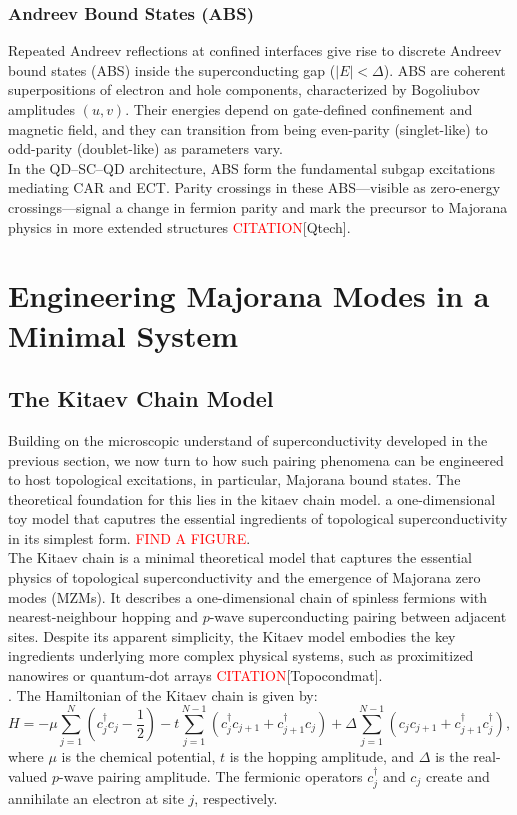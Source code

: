 \documentclass[11pt, letterpaper, titlepage]{article}
\begin{document}
\subsubsection{Andreev Bound States (ABS)}
Repeated Andreev reflections at confined interfaces give rise to discrete Andreev bound states (ABS) inside the superconducting gap ($|E|<\Delta$). ABS are coherent superpositions of electron and hole components, characterized by Bogoliubov amplitudes $(u,v)$. Their energies depend on gate-defined confinement and magnetic field, and they can transition from being even-parity (singlet-like) to odd-parity (doublet-like) as parameters vary.\\
In the QD–SC–QD architecture, ABS form the fundamental subgap excitations mediating CAR and ECT. Parity crossings in these ABS—visible as zero-energy crossings—signal a change in fermion parity and mark the precursor to Majorana physics in more extended structures \textcolor{red}{CITATION}[Qtech].


\section{Engineering Majorana Modes in a Minimal System}
\subsection{The Kitaev Chain Model}
Building on the microscopic understand of superconductivity developed in the previous section, we now turn to how such pairing phenomena can be engineered to host topological excitations, in particular, Majorana bound states. The theoretical foundation for this lies in the kitaev chain model. a one-dimensional toy model that caputres the essential ingredients of topological superconductivity in its simplest form. \textcolor{red}{FIND A FIGURE}.\\
The Kitaev chain is a minimal theoretical model that captures the essential physics of topological superconductivity and the emergence of Majorana zero modes (MZMs). It describes a one-dimensional chain of spinless fermions with nearest-neighbour hopping and $p$-wave superconducting pairing between adjacent sites. Despite its apparent simplicity, the Kitaev model embodies the key ingredients underlying more complex physical systems, such as proximitized nanowires or quantum-dot arrays \textcolor{red}{CITATION}[Topocondmat].\\.
The Hamiltonian of the Kitaev chain is given by:
\begin{equation}
H = -\mu \sum_{j=1}^{N} \left(c_j^\dagger c_j - \frac{1}{2}\right)
- t \sum_{j=1}^{N-1} \left(c_j^\dagger c_{j+1} + c_{j+1}^\dagger c_j\right)
+ \Delta \sum_{j=1}^{N-1} \left(c_j c_{j+1} + c_{j+1}^\dagger c_j^\dagger\right),
\label{eq:kitaev_ham}
\end{equation}
where $\mu$ is the chemical potential, $t$ is the hopping amplitude, and $\Delta$ is the real-valued $p$-wave pairing amplitude. The fermionic operators $c_j^\dagger$ and $c_j$ create and annihilate an electron at site $j$, respectively.
\end{document}
